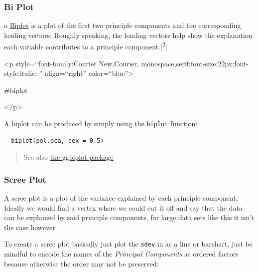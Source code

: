 \documentclass[11pt]{article}
\begin{document}
\subsubsection{Bi Plot}
\label{sec:orgcd4694d}
a \href{https://en.wikipedia.org/wiki/Biplot}{Biplot} is a plot of the
first two principle components and the corresponding loading vectors.
Roughly speaking, the loading vectors help show the explanation each
variable contributes to a principle component.[\textsuperscript{2}]

\begin{HTML}
<p style=``font-family:Courier New,Courier, monospace,serif;font-size:22px;font-style:italic; '' align=``right'' color=``blue''>
\end{HTML}

\#biplot

\begin{HTML}
</p>
\end{HTML}

A biplot can be produced by simply using the \texttt{biplot} function:

\begin{verbatim}
  biplot(pol.pca, cex = 0.5)
\end{verbatim}

\begin{quote}
See also \href{https://github.com/vqv/ggbiplot}{the ggbiplot package}
\end{quote}

\subsubsection{Scree Plot}
\label{sec:org2cb97db}
A scree plot is a plot of the variance explained by each principle
component, Ideally we would find a vertex where we could cut it off and
say that the data can be explained by said principle components, for
large data sets like this it isn't the case however.

To create a scree plot basically just plot the \texttt{sdev} in as a line or
barchart, just be mindful to encode the names of the \emph{Principal
Components} as ordered factors because otherwise the order may not be
preserved:
\end{document}
